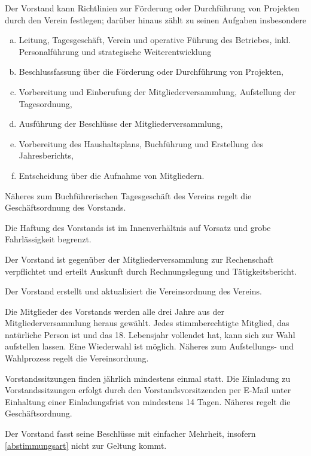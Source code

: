 \begin{contract}
    Der Vorstand kann Richtlinien zur Förderung oder Durchführung von Projekten durch den Verein festlegen; darüber hinaus zählt zu seinen Aufgaben insbesondere
    \begin{enumerate}[(a)]
        \item Leitung, Tagesgeschäft, Verein und operative Führung des Betriebes, inkl. Personalführung und strategische Weiterentwicklung
        \item Beschlussfassung über die Förderung oder Durchführung von Projekten,
        \item Vorbereitung und Einberufung der Mitgliederversammlung, Aufstellung der Tagesordnung,
        \item Ausführung der Beschlüsse der Mitgliederversammlung,
        \item Vorbereitung des Haushaltsplans, Buchführung und Erstellung des Jahresberichts,
        \item Entscheidung über die Aufnahme von Mitgliedern.
    \end{enumerate}
    Näheres zum Buchführerischen Tagesgeschäft des Vereins regelt die Geschäftsordnung des Vorstands.

    Die Haftung des Vorstands ist im Innenverhältnis auf Vorsatz und grobe Fahrlässigkeit begrenzt.

    Der Vorstand ist gegenüber der Mitgliederversammlung zur Rechenschaft verpflichtet und erteilt Auskunft durch Rechnungslegung und Tätigkeitsbericht.

    Der Vorstand erstellt und aktualisiert die Vereinsordnung des Vereins.


    Die Mitglieder des Vorstands werden alle drei Jahre aus der Mitgliederversammlung heraus
    gewählt. Jedes stimmberechtigte Mitglied, das natürliche Person ist und das 18. Lebensjahr
    vollendet hat, kann sich zur Wahl aufstellen lassen. Eine Wiederwahl ist möglich. Näheres zum Aufstellungs- und Wahlprozess regelt die Vereinsordnung.

    Vorstandssitzungen finden jährlich mindestens einmal statt. Die Einladung zu Vorstandssitzungen erfolgt durch den Vorstandsvorsitzenden per E-Mail unter Einhaltung einer Einladungsfrist von mindestens 14 Tagen. Näheres regelt die Geschäftsordnung.

    Der Vorstand fasst seine Beschlüsse mit einfacher Mehrheit, insofern \ref{abstimmungsart} nicht zur Geltung kommt.


\end{contract}
